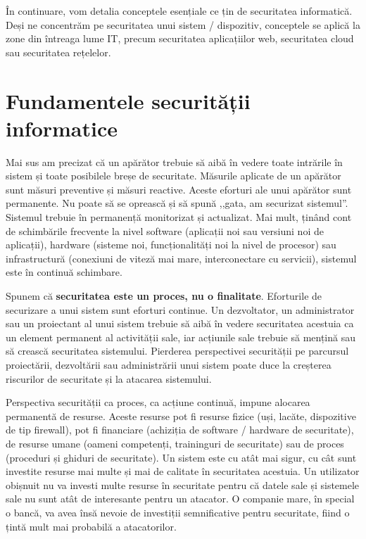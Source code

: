 În continuare, vom detalia conceptele esențiale ce țin de securitatea informatică. Deși ne concentrăm pe securitatea unui sistem / dispozitiv, conceptele se aplică la zone din întreaga lume IT, precum securitatea aplicațiilor web, securitatea cloud sau securitatea rețelelor.

\section{Fundamentele securității informatice}
\label{sec:sec:fundamentals}

Mai sus am precizat că un apărător trebuie să aibă în vedere toate intrările în sistem și toate posibilele breșe de securitate. Măsurile aplicate de un apărător sunt măsuri preventive și măsuri reactive. Aceste eforturi ale unui apărător sunt permanente. Nu poate să se oprească și să spună ,,gata, am securizat sistemul''. Sistemul trebuie în permanență monitorizat și actualizat. Mai mult, ținând cont de schimbările frecvente la nivel software (aplicații noi sau versiuni noi de aplicații), hardware (sisteme noi, funcționalități noi la nivel de procesor) sau infrastructură (conexiuni de viteză mai mare, interconectare cu servicii), sistemul este în continuă schimbare.

Spunem că \textbf{securitatea este un proces, nu o finalitate}. Eforturile de securizare a unui sistem sunt eforturi continue. Un dezvoltator, un administrator sau un proiectant al unui sistem trebuie să aibă în vedere securitatea acestuia ca un element permanent al activității sale, iar acțiunile sale trebuie să mențină sau să crească securitatea sistemului. Pierderea perspectivei securității pe parcursul proiectării, dezvoltării sau administrării unui sistem poate duce la creșterea riscurilor de securitate și la atacarea sistemului.

Perspectiva securității ca proces, ca acțiune continuă, impune alocarea permanentă de resurse. Aceste resurse pot fi resurse fizice (uși, lacăte, dispozitive de tip firewall), pot fi financiare (achiziția de software / hardware de securitate), de resurse umane (oameni competenți, traininguri de securitate) sau de proces (proceduri și ghiduri de securitate). Un sistem este cu atât mai sigur, cu cât sunt investite resurse mai multe și mai de calitate în securitatea acestuia. Un utilizator obișnuit nu va investi multe resurse în securitate pentru că datele sale și sistemele sale nu sunt atât de interesante pentru un atacator. O companie mare, în special o bancă, va avea însă nevoie de investiții semnificative pentru securitate, fiind o țintă mult mai probabilă a atacatorilor.

